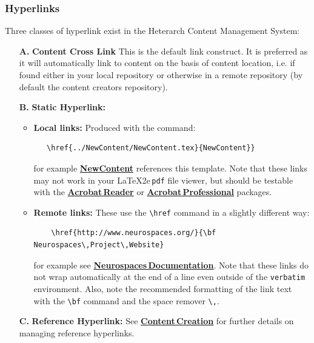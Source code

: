 \documentclass[12pt]{article}
\begin{document}
\subsubsection*{Hyperlinks}

Three classes of hyperlink exist in the Heterarch Content Management System:

\begin{itemize}[noitemsep,nolistsep] 
\item[{\bf A.}]{\bf Content Cross Link} This is the default link construct. It is preferred as it will automatically link to content on the basis of content location, i.e. if found either in your local repository or otherwise in a remote repository (by default the content creators repository).

\item[{\bf B.}]{\bf Static Hyperlink:} 
   \begin{itemize}[noitemsep,nolistsep] 
      \item{\bf Local links:} Produced with the command:
\begin{verbatim}
   \href{../NewContent/NewContent.tex}{NewContent}}
\end{verbatim}
for example \href{../NewContent/NewContent.tex}{\bf NewContent} references this template.
Note that these links may not work in your \LaTeX2e\,{\tt pdf} file viewer, but should be testable with the \href{http://get.adobe.com/reader/}{\bf Acrobat\,Reader} or \href{http://www.adobe.com/products/acrobatpro/tryout.html}{\bf Acrobat\,Professional} packages.
      \item {\bf Remote links:} These use the {\tt \textbackslash href} command in a slightly different way:
\begin{verbatim}
    \href{http://www.neurospaces.org/}{\bf Neurospaces\,Project\,Website}
\end{verbatim}
for example see \href{http://www.neurospaces.org/}{\bf Neurospaces\,Documentation}. Note that these links do not wrap automatically at the end of a line even outside of the {\tt verbatim} environment. Also, note the recommended formatting of the link text with the {\tt \textbackslash bf} command and the space remover {\tt \textbackslash ,}.
\end{itemize}

\item[{\bf C.}]{\bf Reference Hyperlink:} See \href{../heterarch-developer-content/heterarch-developer-content.tex}{\bf Content\,Creation} for further details on managing reference hyperlinks.

\end{itemize}
\end{document}
